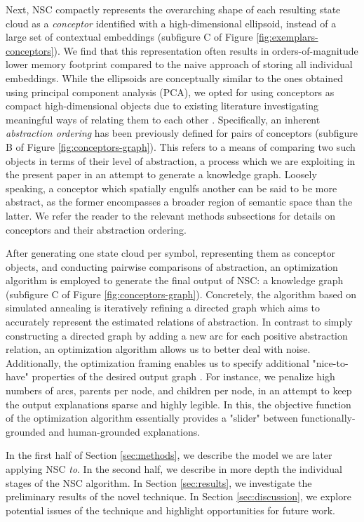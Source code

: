 Next, NSC compactly represents the overarching shape of each resulting state cloud as a \textit{conceptor} identified with a high-dimensional ellipsoid, instead of a large set of contextual embeddings \citep{jaeger_controlling_2017} (subfigure C of Figure \ref{fig:exemplars-conceptors}). We find that this representation often results in orders-of-magnitude lower memory footprint compared to the naive approach of storing all individual embeddings. While the ellipsoids are conceptually similar to the ones obtained using principal component analysis (PCA), we opted for using conceptors as compact high-dimensional objects due to existing literature investigating meaningful ways of relating them to each other \citep{jaeger_controlling_2017}. Specifically, an inherent \textit{abstraction ordering} has been previously defined for pairs of conceptors (subfigure B of Figure \ref{fig:conceptors-graph}). This refers to a means of comparing two such objects in terms of their level of abstraction, a process which we are exploiting in the present paper in an attempt to generate a knowledge graph. Loosely speaking, a conceptor which spatially engulfs another can be said to be more abstract, as the former encompasses a broader region of semantic space than the latter. We refer the reader to the relevant methods subsections for details on conceptors and their abstraction ordering.

After generating one state cloud per symbol, representing them as conceptor objects, and conducting pairwise comparisons of abstraction, an optimization algorithm is employed to generate the final output of NSC: a knowledge graph (subfigure C of Figure \ref{fig:conceptors-graph}). Concretely, the algorithm based on simulated annealing is iteratively refining a directed graph which aims to accurately represent the estimated relations of abstraction. In contrast to simply constructing a directed graph by adding a new arc for each positive abstraction relation, an optimization algorithm allows us to better deal with noise. Additionally, the optimization framing enables us to specify additional "nice-to-have" properties of the desired output graph \citep{madsen_post-hoc_2021}. For instance, we penalize high numbers of arcs, parents per node, and children per node, in an attempt to keep the output explanations sparse and highly legible. In this, the objective function of the optimization algorithm essentially provides a "slider" between functionally-grounded and human-grounded explanations.

In the first half of Section \ref{sec:methods}, we describe the model we are later applying NSC \textit{to}. In the second half, we describe in more depth the individual stages of the NSC algorithm. In Section \ref{sec:results}, we investigate the preliminary results of the novel technique. In Section \ref{sec:discussion}, we explore potential issues of the technique and highlight opportunities for future work.